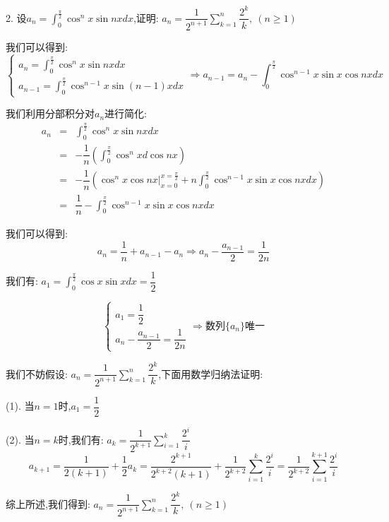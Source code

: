 2. 设$a_{n}=\int_{0}^{\frac{\pi}{2}}\cos^n x\sin nxdx$,证明:  $a_{n}=\dfrac{1}{2^{n+1}}\sum\limits_{k=1}^{n}\dfrac{2^k}{k},\ (n\geq 1)$
\begin{solution}

	我们可以得到:
	$$\left\lbrace
	\begin{array}{l}
		a_{n}=\int_{0}^{\frac{\pi}{2}}\cos^n x\sin nxdx\\
		a_{n-1}=\int_{0}^{\frac{\pi}{2}}\cos^{n-1} x\sin(n-1)xdx
	\end{array}
	\right. \Rightarrow a_{n-1}=a_{n}-\int_{0}^{\frac{\pi}{2}}\cos^{n-1}x\sin x\cos nxdx$$
	
	我们利用分部积分对$a_{n}$进行简化:  
	\begin{eqnarray*}
		a_{n}&=&\int_{0}^{\frac{\pi}{2}}\cos^n x\sin nxdx\\
		&=&-\dfrac{1}{n}\left(\int_{0}^{\frac{\pi}{2}}\cos^n xd\cos nx \right)\\
		&=&-\dfrac{1}{n}\left(\cos^n x\cos nx|_{x=0}^{x=\frac{\pi}{2}}+n\int_{0}^{\frac{\pi}{2}}\cos^{n-1}x\sin x\cos nxdx\right)\\
		&=&\dfrac{1}{n}-\int_{0}^{\frac{\pi}{2}}\cos^{n-1}x\sin x\cos nxdx
	\end{eqnarray*}

	我们可以得到:  $$a_{n}=\dfrac{1}{n}+a_{n-1}-a_{n}\Rightarrow a_{n}-\dfrac{a_{n-1}}{2}=\dfrac{1}{2n}$$
	
	我们有:  $a_{1}=\int_{0}^{\frac{\pi}{2}}\cos x\sin xdx=\dfrac{1}{2}$
	
	$$\left\lbrace
	\begin{array}{l}
		a_{1}=\dfrac{1}{2}\\
		a_{n}-\dfrac{a_{n-1}}{2}=\dfrac{1}{2n}
	\end{array}
	\right. \Rightarrow\text{数列}\{a_{n}\}\text{唯一}$$
	
	我们不妨假设:  $a_{n}=\dfrac{1}{2^{n+1}}\sum\limits_{k=1}^{n}\dfrac{2^k}{k}$,下面用数学归纳法证明:  
	
	(1). 当$n=1$时,$a_{1}=\dfrac{1}{2}$
	
	(2). 当$n=k$时,我们有:  $a_{k}=\dfrac{1}{2^{k+1}}\sum\limits_{i=1}^{k}\dfrac{2^i}{i}$
	$$a_{k+1}=\dfrac{1}{2(k+1)}+\dfrac{1}{2}a_{k}=\dfrac{2^{k+1}}{2^{k+2}(k+1)}+\dfrac{1}{2^{k+2}}\sum\limits_{i=1}^{k}\dfrac{2^i}{i}=\dfrac{1}{2^{k+2}}\sum\limits_{i=1}^{k+1}\dfrac{2^i}{i}$$
	
	综上所述,我们得到:  $a_{n}=\dfrac{1}{2^{n+1}}\sum\limits_{k=1}^{n}\dfrac{2^k}{k},\ (n\geq 1)$
\end{solution}

